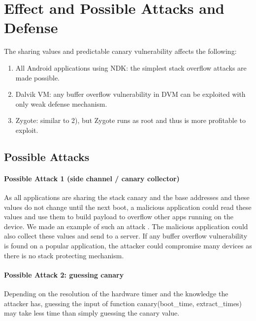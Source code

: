 \section{Effect and Possible Attacks and Defense}

The sharing values and predictable canary vulnerability affects the following:
\begin{enumerate}

\item All Android applications using NDK: the simplest stack overflow attacks are made possible.

\item Dalvik VM: any buffer overflow vulnerability in DVM can be exploited with only weak defense mechanism.

\item Zygote: similar to 2), but Zygote runs as root and thus is more profitable to exploit.

\end{enumerate}

\subsection{Possible Attacks}

\paragraph*{Possible Attack 1 (side channel / canary collector)} 

As all applications are sharing the stack canary and the base addresses and these values do not change until the next boot, a malicious application could read these values and use them to build payload to overflow other apps running on the device. We made an example of such an attack \cite{jnioverflow}. The malicious application could also collect these values and send to a server. If any buffer overflow vulnerability is found on a popular application, the attacker could compromise many devices as there is no stack protecting mechanism.

\paragraph*{Possible Attack 2: guessing canary} 

Depending on the resolution of the hardware timer and the knowledge the attacker has,  guessing the input of function canary(boot\_time, extract\_times) may take less time than simply guessing the canary value.

